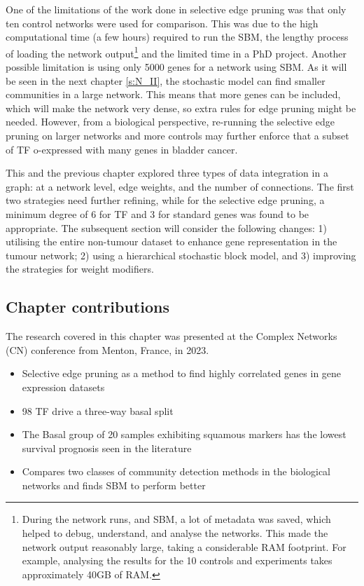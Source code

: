 One of the limitations of the work done in selective edge pruning was that only ten control networks were used for comparison. This was due to the high computational time (a few hours) required to run the SBM, the lengthy process of loading the network output\footnote{During the network runs, and SBM, a lot of metadata was saved, which helped to debug, understand, and analyse the networks. This made the network output reasonably large, taking a considerable RAM footprint. For example, analysing the results for the 10 controls and experiments takes approximately 40GB of RAM.} and the limited time in a PhD project. Another possible limitation is using only 5000 genes for a network using SBM. As it will be seen in the next chapter \cref{s:N_II}, the stochastic model can find smaller communities in a large network. This means that more genes can be included, which will make the network very dense, so extra rules for edge pruning might be needed. However, from a biological perspective, re-running the selective edge pruning on larger networks and more controls may further enforce that a subset of TF o-expressed with many genes in bladder cancer.


This and the previous chapter explored three types of data integration in a graph: at a network level, edge weights, and the number of connections. The first two strategies need further refining, while for the selective edge pruning, a minimum degree of 6 for TF and 3 for standard genes was found to be appropriate. The subsequent section will consider the following changes:  1) utilising the entire non-tumour dataset to enhance gene representation in the tumour network; 2) using a hierarchical stochastic block model, and 3) improving the strategies for weight modifiers.


\subsection{Chapter contributions}

The research covered in this chapter was presented at the Complex Networks (CN) conference from Menton, France, in 2023.

\begin{itemize}
    \item Selective edge pruning as a method to find highly correlated genes in gene expression datasets 
    \item 98 TF drive a three-way basal split
    \item The Basal group of 20 samples exhibiting squamous markers has the lowest survival prognosis seen in the literature
    \item Compares two classes of community detection methods in the biological networks and finds SBM to perform better 
\end{itemize}
